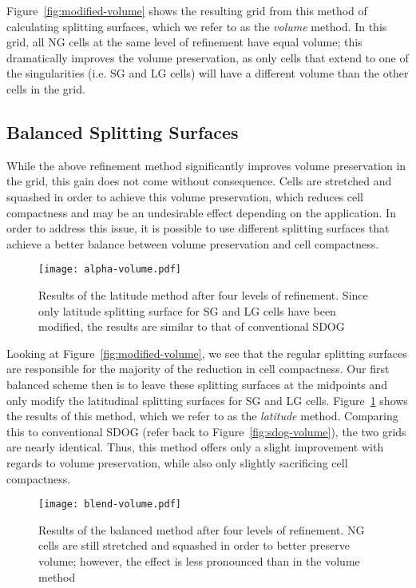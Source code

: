 Figure~\ref{fig:modified-volume} shows the resulting grid from this method of calculating splitting surfaces, which we refer to as the \textit{volume} method.
In this grid, all NG cells at the same level of refinement have equal volume; this dramatically improves the volume preservation, as only cells that extend to one of the singularities (i.e. SG and LG cells) will have a different volume than the other cells in the grid.


\subsection{Balanced Splitting Surfaces} \label{chap:4:balanced}
While the above refinement method significantly improves volume preservation in the grid, this gain does not come without consequence.
Cells are stretched and squashed in order to achieve this volume preservation, which reduces cell compactness and may be an undesirable effect depending on the application.
In order to address this issue, it is possible to use different splitting surfaces that achieve a better balance between volume preservation and cell compactness.


\begin{figure}[ht!]
	\centering
	\texttt{[image: alpha-volume.pdf]}
	\caption[Title]{
		Results of the latitude method after four levels of refinement.
		Since only latitude splitting surface for SG and LG cells have been modified, the results are similar to that of conventional SDOG
	}
	\label{fig:alpha-volume}
\end{figure}


Looking at Figure~\ref{fig:modified-volume}, we see that the regular splitting surfaces are responsible for the majority of the reduction in cell compactness.
Our first balanced scheme then is to leave these splitting surfaces at the midpoints and only modify the latitudinal splitting surfaces for SG and LG cells.
Figure~\ref{fig:alpha-volume} shows the results of this method, which we refer to as the \textit{latitude} method.
Comparing this to conventional SDOG (refer back to Figure~\ref{fig:sdog-volume}), the two grids are nearly identical.
Thus, this method offers only a slight improvement with regards to volume preservation, while also only slightly sacrificing cell compactness.


\begin{figure}[ht!]
	\centering
	\texttt{[image: blend-volume.pdf]}
	\caption[Title]{
		Results of the balanced method after four levels of refinement.
		NG cells are still stretched and squashed in order to better preserve volume; however, the effect is less pronounced than in the volume method
	}
	\label{fig:blend-volume}
\end{figure}


